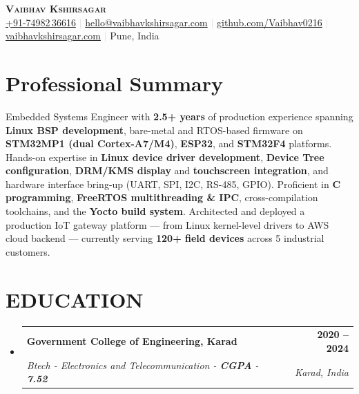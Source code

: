 \documentclass[letterpaper,10.5pt]{article}
\makeatletter
\newcommand{\resumeSubheading}[4]{%
  \vspace{-2pt}\item
  \begin{tabular*}{1.0\textwidth}[t]{l@{\extracolsep{\fill}}r}
    \textbf{\color{navy}#1} & \textbf{\small\color{navy}#2}\\
    \textit{\small\color{medgray}#3} & \textit{\small\color{medgray}#4}\\
  \end{tabular*}\vspace{-6pt}}
\newcommand{\resumeSubHeadingListStart}{\begin{itemize}[leftmargin=0.0in, label={}]}
\newcommand{\resumeSubHeadingListEnd}{\end{itemize}}
\makeatother
\begin{document}
\begin{center}
  {\Huge\scshape\bfseries\color{navy} Vaibhav Kshirsagar}\\[5pt]
  \small\color{darkgray}
  \href{tel:+917498236616}{+91-74982\,36616}
  \quad\textcolor{lightgray}{$|$}\quad
  \href{mailto:hello@vaibhavkshirsagar.com}{hello@vaibhavkshirsagar.com}
  \quad\textcolor{lightgray}{$|$}\quad
  \href{https://github.com/Vaibhav0216}{github.com/Vaibhav0216}
  \quad\textcolor{lightgray}{$|$}\quad
  \href{https://vaibhavkshirsagar.com}{vaibhavkshirsagar.com}
  \quad\textcolor{lightgray}{$|$}\quad
  Pune, India
\end{center}

\vspace{-6pt}

\section{Professional Summary}
\vspace{2pt}
{\small\color{darkgray}
Embedded Systems Engineer with \textbf{2.5+ years} of production experience spanning \textbf{Linux BSP development}, bare-metal and RTOS-based firmware on \textbf{STM32MP1 (dual Cortex-A7/M4)}, \textbf{ESP32}, and \textbf{STM32F4} platforms. Hands-on expertise in \textbf{Linux device driver development}, \textbf{Device Tree configuration}, \textbf{DRM/KMS display} and \textbf{touchscreen integration}, and hardware interface bring-up (UART, SPI, I2C, RS-485, GPIO). Proficient in \textbf{C programming}, \textbf{FreeRTOS multithreading \& IPC}, cross-compilation toolchains, and the \textbf{Yocto build system}. Architected and deployed a production IoT gateway platform — from Linux kernel-level drivers to AWS cloud backend — currently serving \textbf{120+ field devices} across 5 industrial customers.
}

\vspace{-2pt}


\section{EDUCATION}
\vspace{0.5em}
  \resumeSubHeadingListStart
    \resumeSubheading
      {Government College of Engineering, Karad}{2020 -- 2024}
      {Btech - Electronics and Telecommunication - \textbf{CGPA} - \textbf{7.52}}{Karad, India}
  \resumeSubHeadingListEnd
\end{document}
